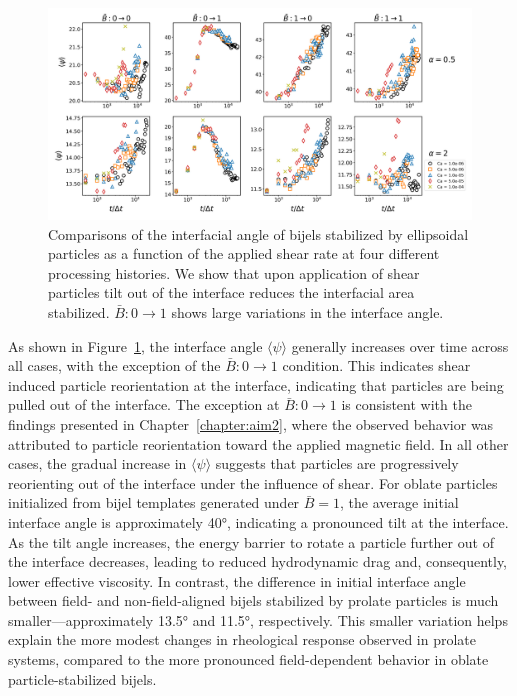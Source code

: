 \begin{figure} 
    \centering 
    \includegraphics[scale=0.3]{../figures/results/paper3/psi-time_compare.png} 
    \caption{Comparisons of the interfacial angle of bijels stabilized by ellipsoidal particles as a function of 
             the applied shear rate at four different processing histories. We show that upon application of shear
             particles tilt out of the interface reduces the interfacial area stabilized. $\bar{B}: 0 \to 1$ shows 
             large variations in the interface angle.} 
    \label{fig:interface_angle_shear} 
\end{figure}

As shown in Figure~\ref{fig:interface_angle_shear}, the interface angle $\langle \psi \rangle$ generally increases over time across all cases, with the 
exception of the $\bar{B}: 0 \rightarrow 1$ condition. This indicates shear induced particle reorientation at the interface, indicating that particles are
being pulled out of the interface. The exception at $\bar{B}: 0 \rightarrow 1$ is consistent with the findings presented in Chapter~\ref{chapter:aim2}, where the 
observed behavior was attributed to particle reorientation toward the applied magnetic field. In all other cases, the gradual increase in $\langle \psi \rangle$ 
suggests that particles are progressively reorienting out of the interface under the influence of shear. For oblate particles initialized from bijel templates 
generated under $\bar{B} = 1$, the average initial interface angle is approximately 40°, indicating a pronounced tilt at the interface. As the tilt angle 
increases, the energy barrier to rotate a particle further out of the interface decreases, leading to reduced hydrodynamic drag and, consequently, lower 
effective viscosity. In contrast, the difference in initial interface angle between field- and non-field-aligned bijels stabilized by prolate particles 
is much smaller—approximately 13.5° and 11.5°, respectively. This smaller variation helps explain the more modest changes in rheological response observed 
in prolate systems, compared to the more pronounced field-dependent behavior in oblate particle-stabilized bijels.

